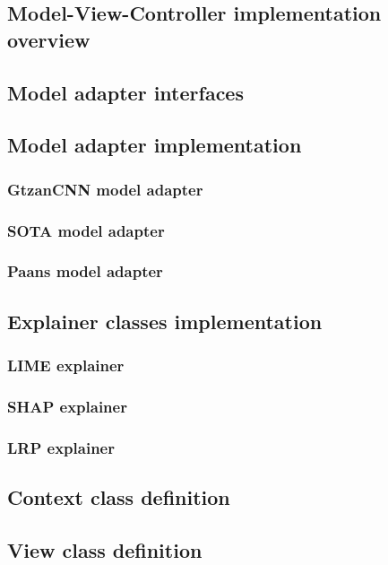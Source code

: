 \documentclass[
    bindingoffset=5mm,  %
    footnoteindent=3mm, %
    hyphenation=true    %
]{src/wut-thesis}
\begin{document}
\subsection{Model-View-Controller implementation overview}

\subsection{Model adapter interfaces}

\subsection{Model adapter implementation}
\subsubsection{GtzanCNN model adapter}
\subsubsection{SOTA model adapter}
\subsubsection{Paans model adapter}

\subsection{Explainer classes implementation}
\subsubsection{LIME explainer}
\subsubsection{SHAP explainer}
\subsubsection{LRP explainer}

\subsection{Context class definition}

\subsection{View class definition}
\end{document}
